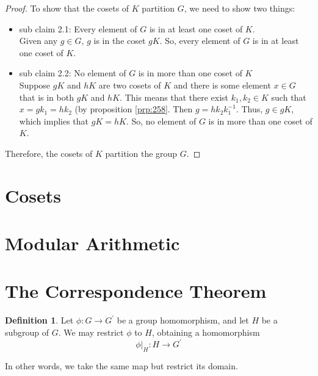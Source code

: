 \documentclass[
]{book}
\theoremstyle{definition}
\newtheorem{definition}{Definition}[chapter]
\theoremstyle{definition}
\theoremstyle{definition}
\theoremstyle{definition}
\theoremstyle{remark}
\begin{document}
\begin{proof}
To show that the cosets of \(K\) partition \(G\), we need to show two things:

\begin{itemize}
\item
  sub claim 2.1: Every element of \(G\) is in at least one coset of \(K\).\\
  Given any \(g \in G\), \(g\) is in the coset \(gK\). So, every element of \(G\) is in at least one coset of \(K\).
\item
  sub claim 2.2: No element of \(G\) is in more than one coset of \(K\)\\
  Suppose \(gK\) and \(hK\) are two cosets of \(K\) and there is some element \(x \in G\) that is in both \(gK\) and \(hK\). This means that there exist \(k_1, k_2 \in K\) such that \(x = gk_1 = hk_2\) (by proposition \ref{prp:258}. Then \(g = hk_2k_1^{-1}\). Thus, \(g\in gK\), which implies that \(gK = hK\).
  So, no element of \(G\) is in more than one coset of \(K\).
\end{itemize}

Therefore, the cosets of \(K\) partition the group \(G\).
\end{proof}

\hypertarget{cosets}{%
\section{Cosets}\label{cosets}}

\hypertarget{modular-arithmetic}{%
\section{Modular Arithmetic}\label{modular-arithmetic}}

\hypertarget{the-correspondence-theorem}{%
\section{The Correspondence Theorem}\label{the-correspondence-theorem}}

\begin{definition}
\protect\hypertarget{def:unnamed-chunk-38}{}\label{def:unnamed-chunk-38}Let \(\phi: G \rightarrow G^\prime\) be a group homomorphism, and let \(H\) be a subgroup of \(G\). We may restrict \(\phi\) to \(H\), obtaining a homomorphism
\[\phi|_H: H \rightarrow G^\prime\]
\end{definition}

In other words, we take the same map but restrict its domain.
\end{document}

